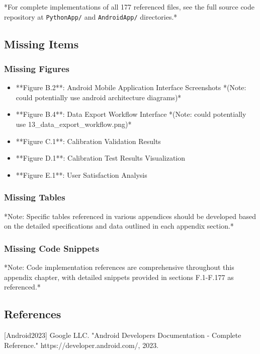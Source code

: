 \documentclass[11pt,a4paper]{article}
\begin{document}
{{*For complete implementations of all 177 referenced files, see the full source code repository at \texttt{PythonApp/}
and \texttt{AndroidApp/} directories.*

\subsection{Missing Items}

\subsubsection{Missing Figures}

\begin{itemize}
\item **Figure B.2**: Android Mobile Application Interface Screenshots *(Note: could potentially use android architecture
  diagrams)*
\item **Figure B.4**: Data Export Workflow Interface *(Note: could potentially use 13_data_export_workflow.png)*
\item **Figure C.1**: Calibration Validation Results
\item **Figure D.1**: Calibration Test Results Visualization
\item **Figure E.1**: User Satisfaction Analysis

\end{itemize}
\subsubsection{Missing Tables}

*Note: Specific tables referenced in various appendices should be developed based on the detailed specifications and
data outlined in each appendix section.*

\subsubsection{Missing Code Snippets}

*Note: Code implementation references are comprehensive throughout this appendix chapter, with detailed snippets
provided in sections F.1-F.177 as referenced.*

\subsection{References}

[Android2023] Google LLC. "Android Developers Documentation - Complete Reference." https://developer.android.com/, 2023.

}}
\end{document}
